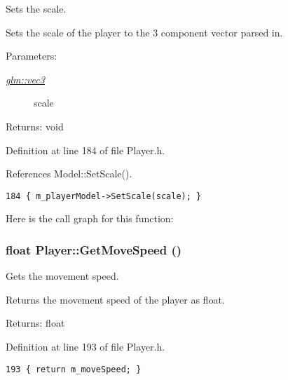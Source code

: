 Sets the scale. 

Sets the scale of the player to the 3 component vector parsed in.

\begin{Desc}
\item[Parameters:]
\begin{description}
\item[{\em \hyperlink{group__core__types_g1c47e8b3386109bc992b6c48e91b0be7}{glm::vec3}}]scale \end{description}
\end{Desc}
\begin{Desc}
\item[Returns:]void \end{Desc}


Definition at line 184 of file Player.h.

References Model::SetScale().

\begin{Code}\begin{verbatim}184 { m_playerModel->SetScale(scale); }
\end{verbatim}
\end{Code}




Here is the call graph for this function:\hypertarget{class_player_f0f47c5d51eeb711111f692595d211d5}{
\subsubsection[GetMoveSpeed]{\setlength{\rightskip}{0pt plus 5cm}float Player::GetMoveSpeed ()}}
\label{class_player_f0f47c5d51eeb711111f692595d211d5}


Gets the movement speed. 

Returns the movement speed of the player as float.

\begin{Desc}
\item[Returns:]float \end{Desc}


Definition at line 193 of file Player.h.

\begin{Code}\begin{verbatim}193 { return m_moveSpeed; }
\end{verbatim}
\end{Code}


